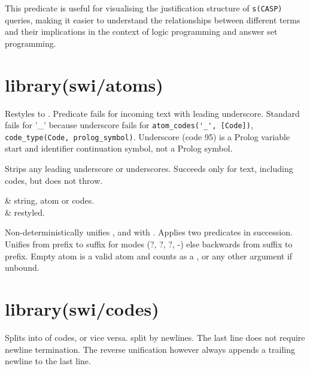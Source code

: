 \begin{description}
This predicate is useful for visualising the justification structure of
\verb$s(CASP)$ queries, making it easier to understand the relationships
between different terms and their implications in the context of logic
programming and answer set programming.
\end{description}

\chapter{library(swi/atoms)}\label{sec:atoms}

\begin{description}
Restyles  to . Predicate  fails for
incoming text with leading underscore. Standard
 fails for '_' because underscore fails for
\verb$atom_codes('_', [Code])$, \verb$code_type(Code, prolog_symbol)$. Underscore
(code 95) is a Prolog variable start and identifier continuation
symbol, not a Prolog symbol.

Strips any leading underscore or underscores. Succeeds only for
text, including codes, but does not throw.

\begin{arguments}
 & string, atom or codes. \\
 & restyled. \\
\end{arguments}

Non-deterministically unifies ,  and  with .
Applies two  predicates in succession. Unifies from
prefix to suffix for modes (?, ?, ?, -) else backwards from suffix
to prefix. Empty atom is a valid atom and counts as a , 
or any other argument if unbound.
\end{description}

\chapter{library(swi/codes)}\label{sec:codes}

\begin{description}
Splits  into  of codes, or vice versa.  split by
newlines. The last line does not require newline termination. The
reverse unification however always appends a trailing newline to the
last line.
\end{description}

